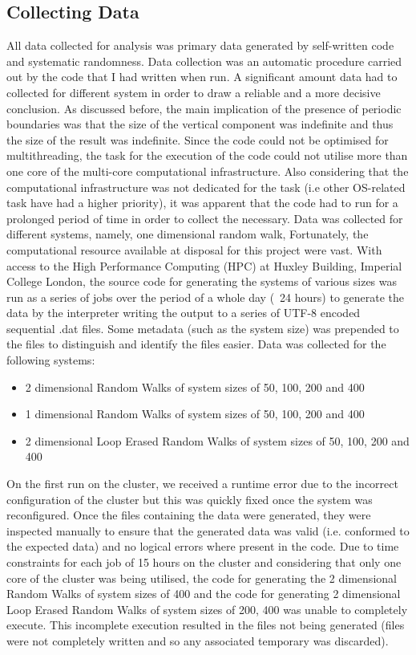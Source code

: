 \documentclass{article}
\begin{document}
\subsection{Collecting Data}
	 All data collected for analysis was primary data generated by self-written code and systematic randomness.  Data collection was an automatic procedure carried out by the code that I had written when run. A significant amount data had to collected for different system in order to draw a reliable and a more decisive conclusion. As discussed before, the main implication of the presence of periodic boundaries was that the size of the vertical component was indefinite and thus the size of the result was indefinite. Since the code could not be optimised for multithreading, the task for the execution of the code could not utilise more than one core of the multi-core computational infrastructure. Also considering that the computational infrastructure was not dedicated for the task (i.e other OS-related task have had a higher priority), it was apparent that the code had to run for a prolonged period of time in order to collect the necessary. Data was collected for different systems, namely, one dimensional random walk,
\newline
Fortunately, the computational resource available at disposal for this project were vast. With access to the High Performance Computing (HPC) at Huxley Building, Imperial College London, the source code for generating the systems of various sizes was run as a series of jobs over the period of a whole day (~24 hours) to generate the data  by the interpreter writing the output to a series of UTF-8 encoded sequential .dat files. Some metadata (such as the system size) was prepended to the files to distinguish and identify the files easier.
\newline
Data was collected for the following systems:
\begin{itemize}
	\item 2 dimensional Random Walks of system sizes of 50, 100, 200 and 400
	\item 1 dimensional Random Walks of system sizes of 50, 100, 200 and 400
	\item 2 dimensional Loop Erased Random Walks of system sizes of 50, 100, 200 and 400
\end{itemize}
On the first run on the cluster, we received a runtime error due to the incorrect configuration of the cluster but this was quickly fixed once the system was reconfigured. Once the files containing the data were generated, they were inspected manually to ensure that the generated data was valid (i.e. conformed to the expected data) and no logical errors where present in the code. Due to time constraints for each job of 15 hours on the cluster and considering that only one core of the cluster was being utilised, the code for generating the 2 dimensional Random Walks of system sizes of 400 and the code for generating 2 dimensional Loop Erased Random Walks of system sizes of 200, 400 was unable to completely execute. This incomplete execution resulted in the files not being generated (files were not completely written and so any associated temporary was discarded).
\end{document}
